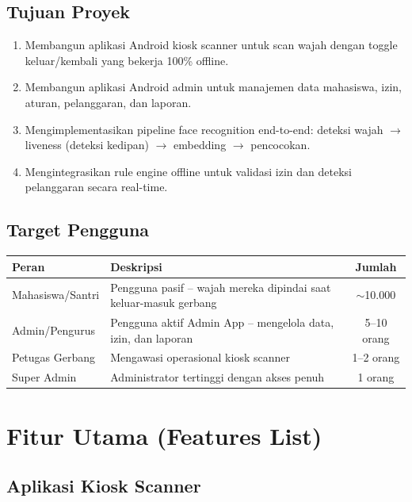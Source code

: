 \documentclass[12pt,a4paper]{article}
\begin{document}
\subsection{Tujuan Proyek}

\begin{enumerate}[nolistsep]
  \item Membangun aplikasi Android kiosk scanner untuk scan wajah dengan toggle keluar/kembali yang bekerja 100\% offline.
  \item Membangun aplikasi Android admin untuk manajemen data mahasiswa, izin, aturan, pelanggaran, dan laporan.
  \item Mengimplementasikan pipeline face recognition end-to-end: deteksi wajah $\rightarrow$ liveness (deteksi kedipan) $\rightarrow$ embedding $\rightarrow$ pencocokan.
  \item Mengintegrasikan rule engine offline untuk validasi izin dan deteksi pelanggaran secara real-time.
\end{enumerate}

\subsection{Target Pengguna}

\begin{table}[H]
  \centering
  \begin{tabularx}{\textwidth}{lXc}
    \toprule
    \textbf{Peran} & \textbf{Deskripsi} & \textbf{Jumlah} \\
    \midrule
    Mahasiswa/Santri & Pengguna pasif -- wajah mereka dipindai saat keluar-masuk gerbang & $\sim$10.000 \\
    Admin/Pengurus & Pengguna aktif Admin App -- mengelola data, izin, dan laporan & 5--10 orang \\
    Petugas Gerbang & Mengawasi operasional kiosk scanner & 1--2 orang \\
    Super Admin & Administrator tertinggi dengan akses penuh & 1 orang \\
    \bottomrule
  \end{tabularx}
\end{table}

\section{Fitur Utama (Features List)}

\subsection{Aplikasi Kiosk Scanner}
\end{document}
